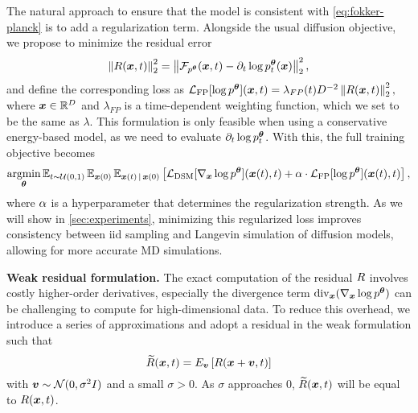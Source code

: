 The natural approach to ensure that the model is consistent with \cref{eq:fokker-planck} is to add a regularization term. Alongside the usual diffusion objective, we propose to minimize the residual error
\begin{equation}
    \left\Vert R({{\bm{x}}}, {t})\right\Vert^2_2 = 
    \left\Vert {\mathcal{F}}_{p^{\bm{\theta}}} ({{\bm{x}}}, {t}) - \partial_{t} \log p^{\bm{\theta}}_{t}({{\bm{x}}}) \right\Vert^2_2,
    \label{eq:residual}
\end{equation}
and define the corresponding loss as $\mathcal{L}_{\text{FP}} [\log p^{\bm{\theta}}]({{\bm{x}}}, {t}) = \lambda_{FP}({t}) D^{-2}  \left\Vert R({{\bm{x}}}, {t}) \right\Vert^2_2,$
where ${{\bm{x}}} \in \mathbb{R}^D$ and $\lambda_{FP}$ is a time-dependent weighting function, which we set to be the same as $\lambda$. This formulation is only feasible when using a conservative energy-based model, as we need to evaluate $\partial_{t} \log p^{\bm{\theta}}_{t}$. 
With this, the full training objective becomes
\begin{equation}
    \operatorname*{argmin}_{{\bm{\theta}}} \operatorname{\mathbb{E}}_{{t} \sim \mathcal{U}(0, 1)} \operatorname{\mathbb{E}}_{{{\bm{x}}}(0)} \operatorname{\mathbb{E}}_{{{\bm{x}}}(t) \,|\, {{\bm{x}}}(0)} \left[ \mathcal{L}_{\text{DSM}} [\nabla_{{\bm{x}}} \log p^{\bm{\theta}}]({{\bm{x}}}({t}), {t}) + \alpha \cdot \mathcal{L}_{\text{FP}} [\log p^{\bm{\theta}}]({{\bm{x}}}({t}), {t}) \right],
    \label{eq:fp-training}
\end{equation}
where $\alpha$ is a hyperparameter that determines the regularization strength. As we will show in \cref{sec:experiments}, minimizing this regularized loss improves consistency between iid sampling and Langevin simulation of diffusion models, allowing for more accurate \gls{MD} simulations.

\textbf{Weak residual formulation.} The exact computation of the residual $R$ involves costly higher-order derivatives, especially the divergence term $\operatorname{div}_{{\bm{x}}}(\nabla_{{\bm{x}}} \log p^{\bm{\theta}})$ can be challenging to compute for high-dimensional data. To reduce this overhead, we introduce a series of approximations and adopt a residual in the weak formulation \citep{guo2022fieldflows} such that
\begin{equation}
    \widetilde{R}({{\bm{x}}},{t})=E_{{\bm{v}}}\left[R({{\bm{x}}}+{\bm{v}},{t})\right]
    \label{eq:weak-residual}
\end{equation}
with ${\bm{v}} \sim {\mathcal{N}}(0, \sigma^2 I)$ and a small $\sigma > 0$. As $\sigma$ approaches $0$, $\widetilde{R}({{\bm{x}}},{t})$ will be equal to $R({{\bm{x}}},{t})$.

